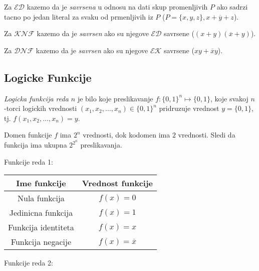 \documentclass[12p, a4paper]{article}
\begin{document}
\begin{multicols}{2}
    Za $\mathcal{ED}$ kazemo da je \emph{savrsena} u odnosu na dati skup 
    promenljivih $P$ ako sadrzi tacno po jedan literal za svaku od
    prmenljivih iz $P$ ($P = \{x, y, z\}, x + \overline{y} + z$).

    Za $\mathcal{KNF}$ kazemo da je \emph{savrsen} ako su njegove 
    $\mathcal{ED}$ savrsene ($(x + y) (\overline{x} + y)$).

    Za $\mathcal{DNF}$ kazemo da je \emph{savrsen} ako su njegove 
    $\mathcal{EK}$ savrsene ($xy + \overline{x}y$).

    \subsection{Logicke Funkcije}
    
    \emph{Logicka funkcija reda $n$} je bilo koje preslikavanje
    $f: {\{0, 1\}}^n \mapsto \{0, 1\}$, koje svakoj $n$-torci logickih 
    vrednosti $(x_1, x_2, \ldots, x_n) \in {\{0, 1\}}^n$ pridruzuje vrednost
    $y = \{0, 1\}$, tj. $f(x_1, x_2, \ldots, x_n) = y$.

    Domen funkcije $f$ ima $2^n$ vrednosti, dok kodomen ima $2$ vrednosti. 
    Sledi da funkcija ima ukupna $2^{2^n}$ preslikavanja.

    Funkcije reda 1:

    \begin{tabular}{*{2}{c}}
        Ime funkcije        & Vrednost funkcije \\
        \midrule
        Nula funkcija       & $f(x) = 0$ \\
        Jedinicna funkcija  & $f(x) = 1$ \\
        Funkcija identiteta & $f(x) = x$ \\
        Funkcija negacije   & $f(x) = \overline{x}$ \\
    \end{tabular}

    Funkcije reda 2:


\end{multicols}
\end{document}
